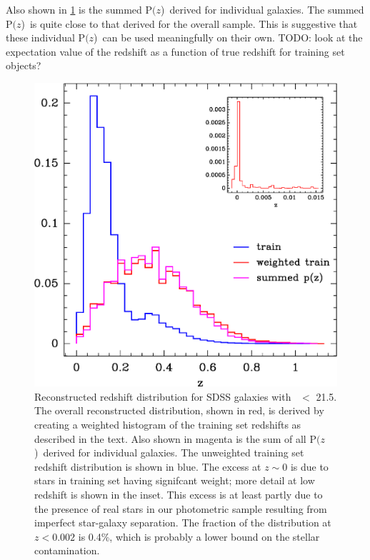 \documentclass[preprint]{aastex}
\newcommand{\rmax}{21.5}
\newcommand{\pofz}{P$(z$)}
\begin{document}
Also shown in \ref{fig:pofz} is the summed \pofz\ derived for individual
galaxies.  The summed \pofz\ is quite close to that derived for the overall
sample.  This is suggestive that these individual \pofz\ can be used
meaningfully on their own.  TODO: look at the expectation value of the redshift
as a function of true redshift for training set objects?

\begin{figure}[t] \centering
    \includegraphics[scale=0.9]{figures/zweight-09-zhist-withorig-withsum-11.eps}

    \caption{Reconstructed redshift distribution for SDSS galaxies with \rmag\
    $ < $ \rmax.  The overall reconstructed distribution, shown in red, is
    derived by creating a weighted histogram of the training set redshifts as
    described in the text.  Also shown in magenta is the sum of all \pofz\
    derived for individual galaxies.  The unweighted training set redshift
    distribution is shown in blue.  The excess at $z \sim 0$ is due to stars in
    training set having signifcant weight; more detail at low redshift is shown
    in the inset.  This excess is at least partly due to the presence of real
    stars in our photometric sample resulting from imperfect star-galaxy
    separation.  The fraction of the distribution at $z < 0.002$ is 0.4\%,
    which is probably a lower bound on the stellar contamination.
    \label{fig:pofz}}

    \vspace{2em}
\end{figure}




\end{document}
